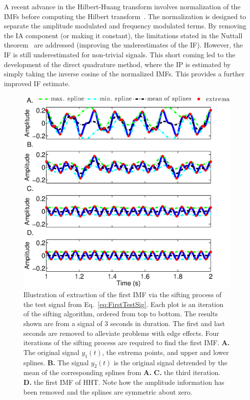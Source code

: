 \documentclass[journal,11pt,a4paper,onecolumn,draftcls]{IEEEtran}
\begin{document}
A recent advance in the Hilbert-Huang transform involves normalization of the IMFs before computing the Hilbert transform~\cite{Huang2005}. The normalization is designed to separate the amplitude modulated and frequency modulated terms. By removing the IA component (or making it constant), the limitations stated in the Nuttall theorem~\cite{Nuttall1966} are addressed (improving the underestimates of the IF). However, the IF is still underestimated for non-trivial signals. This short coming led to the development of the direct quadrature method, where the IP is estimated by simply taking the inverse cosine of the normalized IMFs. This provides a further improved IF estimate.

\begin{figure}
\begin{center}
 \includegraphics[scale=0.42]{./Figures/HHTDemo.eps}
 \caption[HHTDemo]{Illustration of extraction of the first IMF via the sifting process of the test signal from Eq.~\ref{eq:FirstTestSig}. Each plot is an iteration of the sifting algorithm, ordered from top to bottom. The results shown are from a signal of 3 seconds in duration. The first and last seconds are removed to alleviate problems with edge effects. Four iterations of the sifting process are required to find the first IMF. \textbf{A.} The original signal $y_1(t)$, the extrema points, and upper and lower splines. \textbf{B.} The signal $y_2(t)$ is the original signal detrended by the mean of the corresponding splines from \textbf{A.} \textbf{C.} the third iteration. \textbf{D.} the first IMF of HHT. Note how the amplitude information has been removed and the splines are symmetric about zero.}
\label{fig:HHTDemo}
\end{center}
\end{figure}
\end{document}
